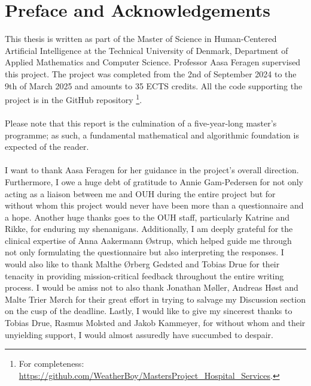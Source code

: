 \section*{Preface and Acknowledgements}
This thesis is written as part of the Master of Science in Human-Centered Artificial Intelligence at the Technical University of Denmark, Department of Applied Mathematics and Computer Science. Professor Aasa Feragen supervised this project. The project was completed from the 2nd of September 2024 to the 9th of March 2025 and amounts to 35 ECTS credits. All the code supporting the project is in the GitHub repository \footnote{For completeness: \href{https://github.com/WeatherBoy/MastersProject_Hospital_Services}{https://github.com/WeatherBoy/MastersProject\_Hospital\_Services}.}.
\\
\\
Please note that this report is the culmination of a five-year-long master's programme; as such, a fundamental mathematical and algorithmic foundation is expected of the reader.
\\
\\
I want to thank Aasa Feragen for her guidance in the project's overall direction. Furthermore, I owe a huge debt of gratitude to Annie Gam-Pedersen for not only acting as a liaison between me and OUH during the entire project but for without whom this project would never have been more than a questionnaire and a hope. Another huge thanks goes to the OUH staff, particularly Katrine and Rikke, for enduring my shenanigans. Additionally, I am deeply grateful for the clinical expertise of Anna Aakermann \O strup, which helped guide me through not only formulating the questionnaire but also interpreting the responses.
I would also like to thank Malthe \O rberg Gedsted and Tobias Drue for their tenacity in providing mission-critical feedback throughout the entire writing process. I would be amiss not to also thank Jonathan M\o ller, Andreas H\o st and Malte Trier M\o rch for their great effort in trying to salvage my Discussion section on the cusp of the deadline.
Lastly, I would like to give my sincerest thanks to Tobias Drue, Rasmus Molsted and Jakob Kammeyer, for without whom and their unyielding support, I would almost assuredly have succumbed to despair.